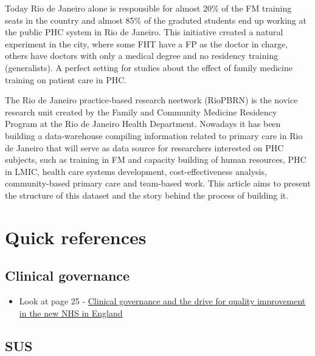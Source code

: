 \documentclass[]{book}
\providecommand{\tightlist}{%
  \setlength{\itemsep}{0pt}\setlength{\parskip}{0pt}}
\begin{document}
Today Rio de Janeiro alone is responsible for almost 20\% of the FM training seats in the country and almost 85\% of the graduted students end up working at the public PHC system in Rio de Janeiro. This initiative created a natural experiment in the city, where some FHT have a FP as the doctor in charge, others have doctors with only a medical degree and no residency training (generalists). A perfect setting for studies about the effect of family medicine training on patient care in PHC.

The Rio de Janeiro practice-based research neetwork (RioPBRN) is the novice research unit created by the Family and Community Medicine Residency Program at the Rio de Janeiro Health Department. Nowadays it has been building a data-warehouse compiling information related to primary care in Rio de Janeiro that will serve as data source for researchers interested on PHC subjects, such as training in FM and capacity building of human resources, PHC in LMIC, health care systems development, cost-effectiveness analysis, community-based primary care and team-based work. This article aims to present the structure of this dataset and the story behind the process of building it.

\hypertarget{quick-references}{%
\chapter*{Quick references}\label{quick-references}}

\hypertarget{clinical-governance}{%
\section*{Clinical governance}\label{clinical-governance}}

\begin{itemize}
\tightlist
\item
  Look at page 25 - \href{https://www.ncbi.nlm.nih.gov/pmc/articles/PMC1113460/pdf/61.pdf}{Clinical governance and the drive for quality improvement in the new NHS in England}
\end{itemize}

\hypertarget{sus}{%
\section*{SUS}\label{sus}}
\end{document}
